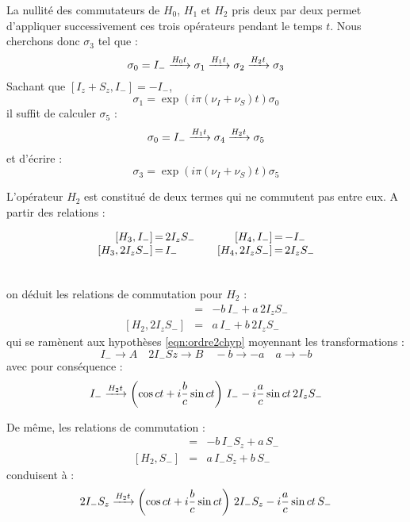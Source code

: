 La nullité des commutateurs de $H_0$, $H_1$ et $H_2$ pris deux par deux
permet d'appliquer successivement ces trois opérateurs pendant le temps $t$.
Nous cherchons donc $\sigma_3$ tel que :
\begin{equation}
\sigma_0 = I_-\xrightarrow{H_0 t} \sigma_1
\xrightarrow{H_1 t} \sigma_2
\xrightarrow{H_2 t} \sigma_3
\end{equation}
Sachant que $[I_z + S_z, I_-] = -I_-$,
\begin{equation}
\sigma_1 = \exp(i\pi(\nu_I+\nu_S)t) \sigma_0
\end{equation}
il suffit de calculer $\sigma_5$ :
\begin{equation}
\sigma_0 = I_- \xrightarrow{H_1 t} \sigma_4
\xrightarrow{H_2 t} \sigma_5
\end{equation}
et d'écrire :
\begin{equation}
\label{eqn:couplefortsigma3}
\sigma_3 = \exp(i\pi(\nu_I+\nu_S)t) \sigma_5
\end{equation}

L'opérateur $H_2$ est constitué de deux termes qui ne commutent
pas entre eux.
A partir des relations :

\noindent\hfill
\parbox{6cm}{
\[
\begin{array}{r@{\,=\,}l@{\quad\quad}r@{\,=\,}l}
[H_3, I_-] & 2I_zS_- & [H_4, I_-] & -I_- \\
{[H_3, 2I_zS_-]} & I_- & [H_4, 2I_zS_-] & 2I_zS_-
\end{array}
\]
}
\hfill
\parbox{1cm}{
\begin{eqnarray}\end{eqnarray}
}

\noindent
on déduit les relations de commutation pour $H_2$ :
\begin{eqnarray}
[H_2, I_-] & = & -b \, I_- + a \, 2I_zS_- \\
{[H_2, 2I_zS_-]} & = & a \, I_- + b \, 2I_zS_-
\end{eqnarray}
qui se ramènent aux hypothèses \ref{eqn:ordre2chyp} moyennant les transformations :
\begin{equation}
I_- \rightarrow A \quad 2I_-Sz \rightarrow B \quad
-b \rightarrow -a \quad a \rightarrow -b
\end{equation}
avec pour conséquence :
\begin{equation}
\label{eqn:evolimh2}
I_- \xrightarrow{H_2 t}
\left(\cos ct + i\frac{b}{c}\sin ct \right) \, I_- -i\frac{a}{c}\sin ct \, 2I_zS_-
\end{equation}

De même, les relations de commutation :
\begin{eqnarray}
[H_2, 2I_-S_z] & = & -b \, I_-S_z + a \, S_- \\
{[H_2, S_-]} & = & a \, I_-S_z + b \, S_-
\end{eqnarray}
conduisent à :
\begin{equation}
\label{eqn:evolimszh2}
2I_-S_z \xrightarrow{H_2 t}
\left(\cos ct + i\frac{b}{c}\sin ct \right) \, 2I_-S_z -i\frac{a}{c}\sin ct \, S_-
\end{equation}

